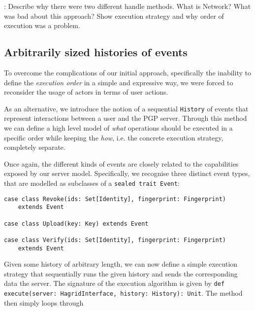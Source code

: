: Describe why there were two different handle methods. What is Network? What was bad about this approach? Show execution strategy and why order of execution was a problem.

\newpage
\subsection{Arbitrarily sized histories of events}
To overcome the complications of our initial approach, specifically the inability to define the \emph{execution order} in a simple and expressive way, we were forced to reconsider the usage of actors in terms of user actions.

As an alternative, we introduce the notion of a sequential \texttt{History} of events that represent interactions between a user and the PGP server.
Through this method we can define a high level model of \emph{what} operations should be executed in a specific order while keeping the \emph{how}, i.e. the concrete execution strategy, completely separate.

Once again, the different kinds of events are closely related to the capabilities exposed by our server model. Specifically, we recognise three distinct event types, that are modelled as subclasses of a \texttt{sealed trait Event}: 
\begin{verbatim}
case class Revoke(ids: Set[Identity], fingerprint: Fingerprint) 
    extends Event

case class Upload(key: Key) extends Event

case class Verify(ids: Set[Identity], fingerprint: Fingerprint) 
    extends Event
\end{verbatim}

Given some history of arbitrary length, we can now define a simple execution strategy that sequentially runs the given history and sends the corresponding data the server.
The signature of the execution algorithm is given by \texttt{def execute(server: HagridInterface, history: History): Unit}. The method then simply loops through 

\newpage

